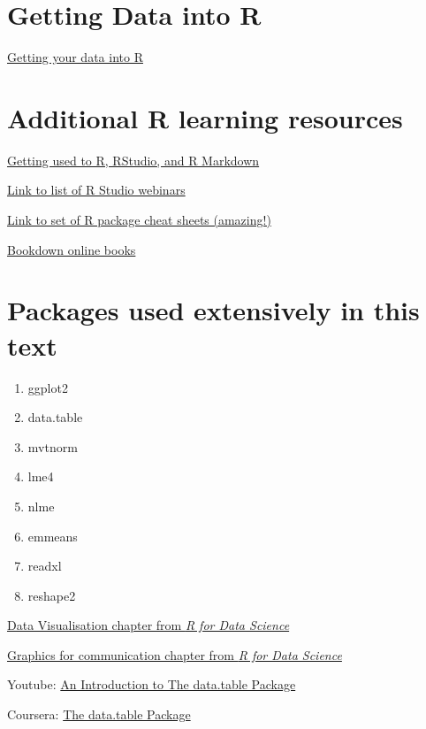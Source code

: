 \documentclass[]{book}
\providecommand{\tightlist}{%
  \setlength{\itemsep}{0pt}\setlength{\parskip}{0pt}}
\begin{document}
\section{Getting Data into R}\label{getting-data-into-r}

\href{https://www.rstudio.com/resources/webinars/getting-your-data-into-r/}{Getting
your data into R}

\section{Additional R learning
resources}\label{additional-r-learning-resources}

\href{https://bookdown.org/chesterismay/rbasics/}{Getting used to R,
RStudio, and R Markdown}

\href{https://www.rstudio.com/resources/webinars/}{Link to list of R
Studio webinars}

\href{https://www.rstudio.com/resources/cheatsheets/}{Link to set of R
package cheat sheets (amazing!)}

\href{https://bookdown.org}{Bookdown online books}

\section{Packages used extensively in this
text}\label{packages-used-extensively-in-this-text}

\begin{enumerate}
\def\labelenumi{\arabic{enumi}.}
\tightlist
\item
  ggplot2
\item
  data.table
\item
  mvtnorm
\item
  lme4
\item
  nlme
\item
  emmeans
\item
  readxl
\item
  reshape2
\end{enumerate}

\href{http://r4ds.had.co.nz/data-visualisation.html}{Data Visualisation
chapter from \emph{R for Data Science}}

\href{http://r4ds.had.co.nz/graphics-for-communication.html}{Graphics
for communication chapter from \emph{R for Data Science}}

Youtube: \href{https://www.youtube.com/watch?v=pc1ARG6kbAM}{An
Introduction to The data.table Package}

Coursera:
\href{https://www.coursera.org/learn/data-cleaning/lecture/trMZ7/the-data-table-package}{The
data.table Package}
\end{document}
